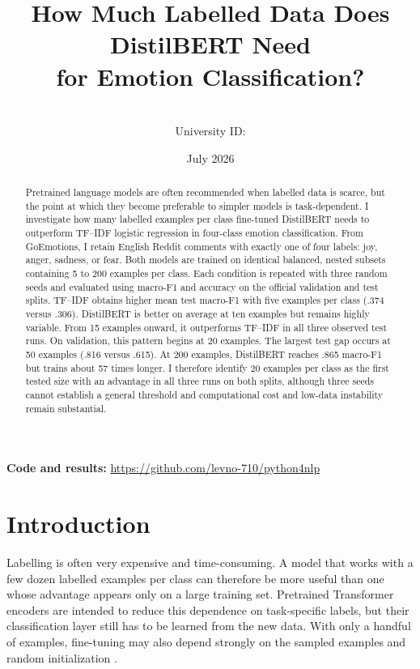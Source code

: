 \documentclass[11pt,a4paper]{article}
\title{How Much Labelled Data Does DistilBERT Need\\
for Emotion Classification?}
\author{\studentname\\University ID: \studentid}
\date{July 2026}
\newcommand{\repository}{\url{https://github.com/levno-710/python4nlp}}
\begin{document}
\maketitle

\begin{abstract}
Pretrained language models are often recommended when labelled data is scarce,
but the point at which they become preferable to simpler models is
task-dependent. I investigate how many labelled examples per class fine-tuned
DistilBERT needs to outperform TF--IDF logistic regression in four-class
emotion classification. From GoEmotions, I retain English Reddit comments with
exactly one of four labels: joy, anger, sadness, or fear. Both models are trained
on identical balanced, nested subsets containing 5 to 200 examples per class.
Each condition is repeated with three random seeds and evaluated using macro-F1
and accuracy on the official validation and test splits. TF--IDF obtains higher
mean test macro-F1 with five examples per class (.374 versus .306). DistilBERT
is better on average at ten examples but remains highly variable. From 15
examples onward, it outperforms TF--IDF in all three observed test runs. On
validation, this pattern begins at 20 examples. The largest test gap occurs at 50
examples (.816 versus .615). At 200 examples, DistilBERT reaches .865 macro-F1
but trains about 57 times longer. I therefore identify 20 examples per class as
the first tested size with an advantage in all three runs on both splits,
although three seeds cannot establish a general threshold and computational
cost and low-data instability remain substantial.
\end{abstract}

\noindent\textbf{Code and results:} \repository

\section{Introduction}

Labelling is often very expensive and time-consuming. A model that
works with a few dozen labelled examples per class can therefore be more useful
than one whose advantage appears only on a large training set. Pretrained
Transformer encoders are intended to reduce this dependence on task-specific
labels, but their classification layer still has to be learned from the new
data. With only a handful of examples, fine-tuning may also depend strongly on
the sampled examples and random initialization \citep{zhang2020revisiting}.
\end{document}
